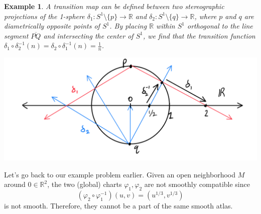 \documentclass{article}
\newtheorem{example}{Example}[section]
\theoremstyle{remark}
\theoremstyle{definition}
\begin{document}
\begin{example}
A transition map can be defined between two stereographic projections of the 1-sphere $\delta_{1}: S^{1} \setminus{\{p\}} \longrightarrow \mathbb{R}$ and $\delta_{2}: S^{1} \setminus{\{q\}} \longrightarrow \mathbb{R}$, where $p$ and $q$ are diametrically opposite points of $S^{1}$. By placing $\mathbb{R}$ within $S^{1}$ orthogonal to the line segment $\overline{PQ}$ and intersecting the center of $S^{1}$, we find that the transition function $\delta_{1} \circ \delta_{2}^{-1}(n) = \delta_{2} \circ \delta_{1}^{-1}(n) = \frac{1}{n}$.  
\begin{center}
    \includegraphics[scale=0.25]{img/1_dim_projection_transition_function.PNG}
\end{center}
\end{example}

Let's go back to our example problem earlier. Given an open neighborhood $M$ around $0 \in \mathbb{R}^2$, the two (global) charts $\varphi_1, \varphi_2$ are not smoothly compatible since 
\[(\varphi_2 \circ \varphi_1^{-1})(u, v) = (u^{1/3}, v^{1/3})\]
is not smooth. Therefore, they cannot be a part of the same smooth atlas. 
\end{document}
